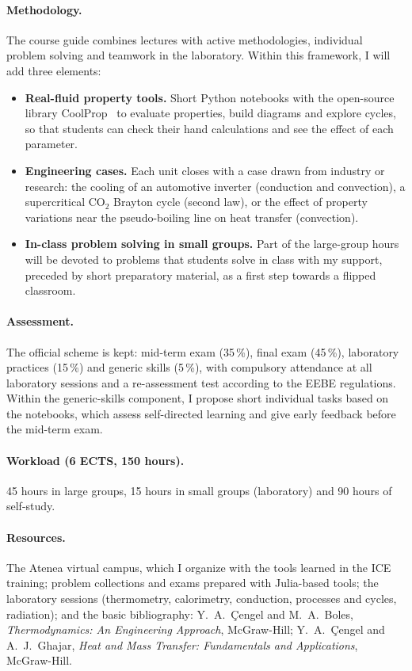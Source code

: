 \documentclass[11pt]{article}
\begin{document}
\paragraph{Methodology.} The course guide combines lectures with active methodologies,
individual problem solving and teamwork in the laboratory. Within this framework, I will
add three elements:
\begin{itemize}
  \item \textbf{Real-fluid property tools.} Short Python notebooks with the open-source
  library CoolProp~\cite{CoolProp2014} to evaluate properties, build diagrams and explore
  cycles, so that students can check their hand calculations and see the effect of each
  parameter.
  \item \textbf{Engineering cases.} Each unit closes with a case drawn from industry or
  research: the cooling of an automotive inverter (conduction and convection), a
  supercritical CO$_2$ Brayton cycle (second law), or the effect of property variations
  near the pseudo-boiling line on heat transfer (convection).
  \item \textbf{In-class problem solving in small groups.} Part of the large-group hours
  will be devoted to problems that students solve in class with my support, preceded by
  short preparatory material, as a first step towards a flipped classroom.
\end{itemize}

\paragraph{Assessment.} The official scheme is kept: mid-term exam (35\,\%), final exam
(45\,\%), laboratory practices (15\,\%) and generic skills (5\,\%), with compulsory
attendance at all laboratory sessions and a re-assessment test according to the EEBE
regulations. Within the generic-skills component, I propose short individual tasks based
on the notebooks, which assess self-directed learning and give early feedback before the
mid-term exam.

\paragraph{Workload (6 ECTS, 150 hours).} 45 hours in large groups, 15 hours in small
groups (laboratory) and 90 hours of self-study.

\paragraph{Resources.} The Atenea virtual campus, which I organize with the tools learned
in the ICE training; problem collections and exams prepared with Julia-based tools; the
laboratory sessions (thermometry, calorimetry, conduction, processes and cycles,
radiation); and the basic bibliography: Y.\ A.\ \c{C}engel and M.\ A.\ Boles,
\emph{Thermodynamics: An Engineering Approach}, McGraw-Hill; Y.\ A.\ \c{C}engel and A.\
J.\ Ghajar, \emph{Heat and Mass Transfer: Fundamentals and Applications}, McGraw-Hill.
\end{document}
